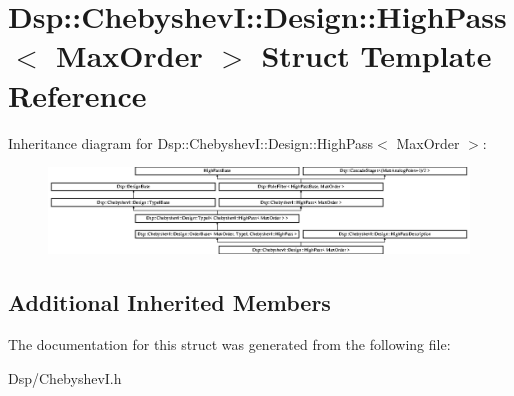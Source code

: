 \hypertarget{structDsp_1_1ChebyshevI_1_1Design_1_1HighPass}{\section{Dsp\-:\-:Chebyshev\-I\-:\-:Design\-:\-:High\-Pass$<$ Max\-Order $>$ Struct Template Reference}
\label{structDsp_1_1ChebyshevI_1_1Design_1_1HighPass}
}
Inheritance diagram for Dsp\-:\-:Chebyshev\-I\-:\-:Design\-:\-:High\-Pass$<$ Max\-Order $>$\-:\begin{figure}[H]
\begin{center}
\leavevmode
\includegraphics[height=2.309278cm]{structDsp_1_1ChebyshevI_1_1Design_1_1HighPass}
\end{center}
\end{figure}
\subsection*{Additional Inherited Members}


The documentation for this struct was generated from the following file\-:\begin{DoxyCompactItemize}
\item 
Dsp/Chebyshev\-I.\-h\end{DoxyCompactItemize}
